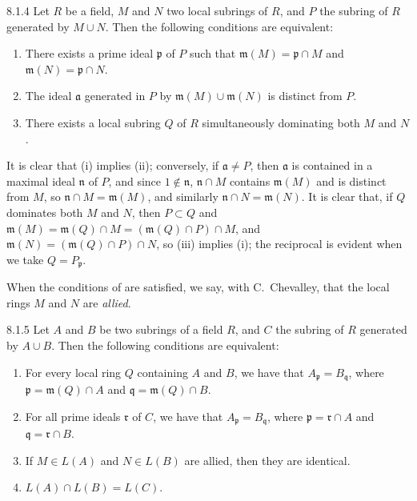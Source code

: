 \documentclass[../main.tex]{subfiles}
\begin{document}
\begin{env}[Lemma]{8.1.4}
    Let $R$ be a field, $M$ and $N$ two local subrings of $R$, and $P$ the subring of $R$ generated by $M\cup N$.
    Then the following conditions are equivalent:
    \begin{enumerate}[label=(\roman*)]
        \item There exists a prime ideal $\mathfrak{p}$ of $P$ such that $\mathfrak{m}(M)=\mathfrak{p}\cap M$ and $\mathfrak{m}(N)=\mathfrak{p}\cap N$.
        \item The ideal $\mathfrak{a}$ generated in $P$ by $\mathfrak{m}(M)\cup\mathfrak{m}(N)$ is distinct from $P$.
        \item There exists a local subring $Q$ of $R$ simultaneously dominating both $M$ and $N$.
    \end{enumerate}
\end{env}

It is clear that (i) implies (ii); conversely, if $\mathfrak{a}\neq P$, then $\mathfrak{a}$ is contained in a maximal ideal $\mathfrak{n}$ of $P$, and since $1\not\in\mathfrak{n}$, $\mathfrak{n}\cap M$ contains $\mathfrak{m}(M)$ and is distinct from $M$, so $\mathfrak{n}\cap M=\mathfrak{m}(M)$, and similarly $\mathfrak{n}\cap N=\mathfrak{m}(N)$.
It is clear that, if $Q$ dominates both $M$ and $N$, then $P\subset Q$ and $\mathfrak{m}(M)=\mathfrak{m}(Q)\cap M=(\mathfrak{m}(Q)\cap P)\cap M$, and $\mathfrak{m}(N)=(\mathfrak{m}(Q)\cap P)\cap N$, so (iii) implies (i); the reciprocal is evident when we take $Q=P_\mathfrak{p}$.

When the conditions of  are satisfied, we say, with C.~Chevalley, that the local rings $M$ and $N$ are \emph{allied}.

\begin{env}[Proposition]{8.1.5}
    Let $A$ and $B$ be two subrings of a field $R$, and $C$ the subring of $R$ generated by $A\cup B$.
    Then the following conditions are equivalent:
    \begin{enumerate}[label=(\roman*)]
        \item For every local ring $Q$ containing $A$ and $B$, we have that $A_\mathfrak{p}=B_\mathfrak{q}$, where $\mathfrak{p}=\mathfrak{m}(Q)\cap A$ and $\mathfrak{q}=\mathfrak{m}(Q)\cap B$.
        \item For all prime ideals $\mathfrak{r}$ of $C$, we have that $A_\mathfrak{p}=B_\mathfrak{q}$, where $\mathfrak{p}=\mathfrak{r}\cap A$ and $\mathfrak{q}=\mathfrak{r}\cap B$.
        \item If $M\in L(A)$ and $N\in L(B)$ are allied, then they are identical.
        \item $L(A)\cap L(B)=L(C)$.
    \end{enumerate}
\end{env}
\end{document}
